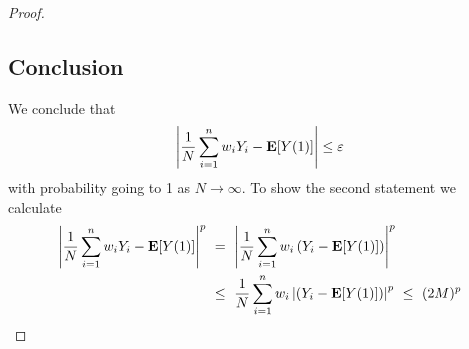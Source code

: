 \begin{proof}
\subsection*{Conclusion}
We conclude that 
\begin{gather}
  \left| 
    \frac{1}{N}
    \sum_{i=1}^{n} 
    w_i
    Y_i
    -
    \mathbf{E}[Y(1)]
  \right|
  \le \varepsilon
\end{gather}
with probability going to 1 as $N\to \infty$. To show the second statement we calculate
\begin{align}
  \left| 
    \frac{1}{N}
    \sum_{i=1}^{n} 
    w_i
    Y_i
    -
    \E[Y(1)]
  \right|
  ^p
  &
  \ 
  =
  \ 
  \left| 
    \frac{1}{N}
    \sum_{i=1}^{n} 
    w_i
    \left( 
    Y_i
    -
    \E[Y(1)]
    \right)
  \right|
  ^p
  \\
  &
  \ 
  \le
  \ 
    \frac{1}{N}
    \sum_{i=1}^{n} 
    w_i
  \left| 
    \left( 
    Y_i
    -
    \E[Y(1)]
    \right)
  \right|
  ^p
  \ 
  \le
  \ 
  (2M)^p
\end{align}
\end{proof}


